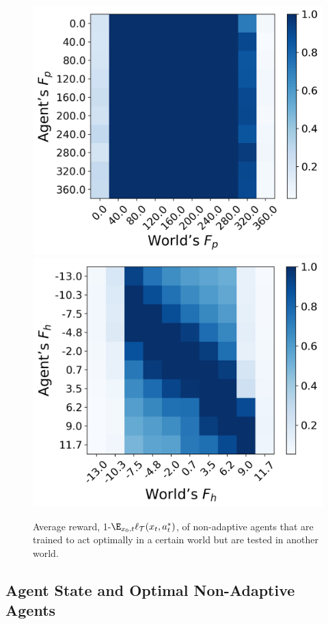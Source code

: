 \begin{figure}
    \centering
    \includegraphics[width=.49\columnwidth]{images/regret_action_force_mag.png}
    \includegraphics[width=.49\columnwidth]{images/regret_env_force.png}
    \caption{Average reward, 1-$\E_{x_0,t} \ell_{{\cal T}} ( x_t, a^*_t) $, of non-adaptive agents that are trained to act optimally in a certain world but are tested in another world.}
    \label{fig:regret}
\end{figure}

\subsection{Agent State and Optimal Non-Adaptive Agents}


